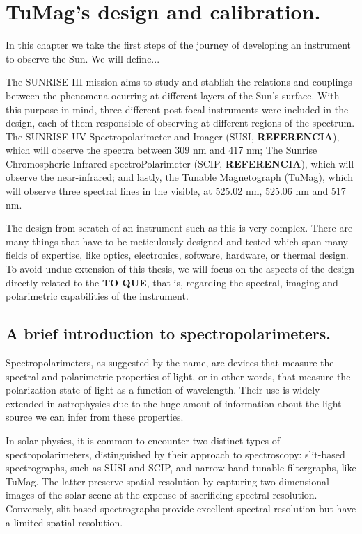\chapter{TuMag's design and calibration.}

In this chapter we take the first steps of the journey of developing an instrument to observe the Sun. We will define... 

The SUNRISE III mission aims to study and stablish the relations and couplings between the phenomena ocurring at different layers of the Sun's surface. With this purpose in mind, three different post-focal instruments were included in the design, each of them responsible of observing at different regions of the spectrum. The SUNRISE UV Spectropolarimeter and Imager (SUSI, \textbf{REFERENCIA}), which will observe the spectra between 309 nm and 417 nm; The Sunrise Chromospheric Infrared spectroPolarimeter (SCIP, \textbf{REFERENCIA}), which will observe the near-infrared; and lastly, the Tunable Magnetograph (TuMag), which will observe three spectral lines in the visible, at 525.02 nm, 525.06 nm and 517 nm. 

The design from scratch of an instrument such as this is very complex. There are many things that have to be meticulously designed and tested which span many fields of expertise, like optics, electronics, software, hardware, or thermal design. To avoid undue extension of this thesis, we will focus on the aspects of the design directly related to the \textbf{TO QUE}, that is, regarding the spectral, imaging and polarimetric capabilities of the instrument. 

\section{A brief introduction to spectropolarimeters.}

Spectropolarimeters, as suggested by the name, are devices that measure the spectral and polarimetric properties of light, or in other words, that measure the polarization state of light as a function of wavelength. Their use is widely extended in astrophysics due to the huge amout of information about the light source we can infer from these properties.

In solar physics, it is common to encounter two distinct types of spectropolarimeters, distinguished by their approach to spectroscopy: slit-based spectrographs, such as SUSI and SCIP, and narrow-band tunable filtergraphs, like TuMag. The latter preserve spatial resolution by capturing two-dimensional images of the solar scene at the expense of sacrificing spectral resolution. Conversely, slit-based spectrographs provide excellent spectral resolution but have a limited spatial resolution. 

